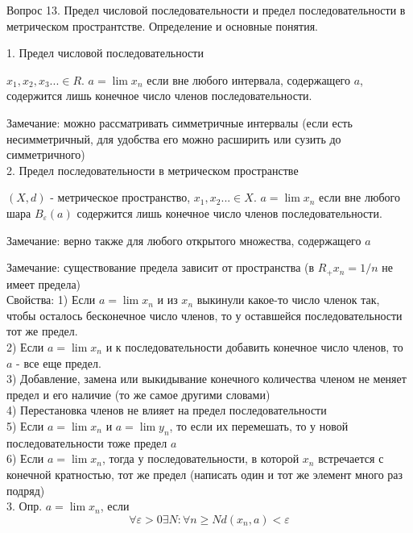 \documentclass[12pt]{article}
\begin{document}
\begin{center}
Вопрос 13. Предел числовой последовательности и предел последовательности в метрическом пространтстве. Определение и основные понятия.
\end{center}

1. Предел числовой последовательности

$x_1, x_2, x_3 ... \in R$. $a=\lim x_n$ если вне любого интервала, содержащего $a$, содержится лишь конечное число членов последовательности.

Замечание: можно рассматривать симметричные интервалы (если есть несимметричный, для удобства его можно расширить или сузить до симметричного)\\

2. Предел последовательности в метрическом пространстве

$(X, d)$ - метрическое пространство, $x_1, x_2 ... \in X$. $a=\lim x_n$ если вне любого шара $B_\varepsilon (a)$ содержится лишь конечное число членов последовательности.

Замечание: верно также для любого открытого множества, содержащего $a$

Замечание: существование предела зависит от пространства (в $R_+ x_n = 1/n$ не имеет предела)\\

Свойства:
1) Если $a=\lim x_n$ и из $x_n$ выкинули какое-то число членок так, чтобы осталось бесконечное число членов, то у оставшейся последовательности тот же предел.\\

2) Если $a=\lim x_n$ и к последовательности добавить конечное число членов, то $a$ - все еще предел.\\

3) Добавление, замена или выкидывание конечного количества членом не меняет предел и его наличие (то же самое другими словами)\\

4) Перестановка членов не влияет на предел последовательности\\

5) Если $a=\lim x_n$ и $a=\lim y_n$, то если их перемешать, то у новой последовательности тоже предел $a$\\

6) Если $a=\lim x_n$, тогда у последовательности, в которой $x_n$ встречается с конечной кратностью, тот же предел (написать один и тот же элемент много раз подряд)\\

3. Опр. $a=\lim x_n$, если
\[ \forall \varepsilon>0 \exists N : \forall n\geq N d(x_n, a)<\varepsilon\]
\end{document}
